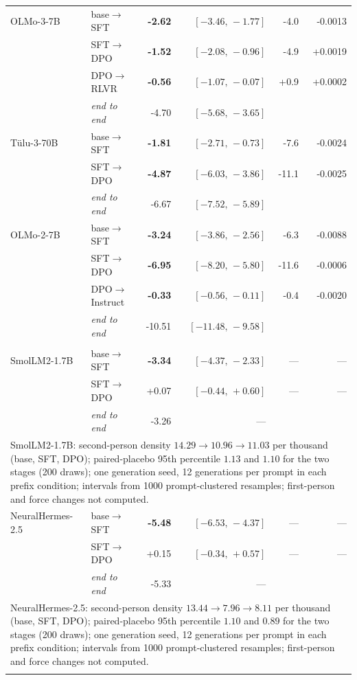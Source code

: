 \begin{table}[tb]
\begin{tabular}{llrrrr}
\addlinespace
OLMo-3-7B    & base$\rightarrow$SFT & \textbf{-2.62} & $[-3.46,\,-1.77]$ & -4.0 & -0.0013 \\
             & SFT$\rightarrow$DPO & \textbf{-1.52} & $[-2.08,\,-0.96]$ & -4.9 & +0.0019 \\
             & DPO$\rightarrow$RLVR & \textbf{-0.56} & $[-1.07,\,-0.07]$ & +0.9 & +0.0002 \\
 & \emph{end to end} & -4.70 & $[-5.68,\,-3.65]$ & & \\
\addlinespace
Tülu-3-70B   & base$\rightarrow$SFT & \textbf{-1.81} & $[-2.71,\,-0.73]$ & -7.6 & -0.0024 \\
             & SFT$\rightarrow$DPO & \textbf{-4.87} & $[-6.03,\,-3.86]$ & -11.1 & -0.0025 \\
 & \emph{end to end} & -6.67 & $[-7.52,\,-5.89]$ & & \\
\addlinespace
OLMo-2-7B    & base$\rightarrow$SFT & \textbf{-3.24} & $[-3.86,\,-2.56]$ & -6.3 & -0.0088 \\
             & SFT$\rightarrow$DPO & \textbf{-6.95} & $[-8.20,\,-5.80]$ & -11.6 & -0.0006 \\
             & DPO$\rightarrow$Instruct & \textbf{-0.33} & $[-0.56,\,-0.11]$ & -0.4 & -0.0020 \\
 & \emph{end to end} & -10.51 & $[-11.48,\,-9.58]$ & & \\
\addlinespace
\midrule
\multicolumn{6}{l}{\emph{Outside the AI2 and Zephyr pipelines (raw continuation)}}\\
SmolLM2-1.7B & base$\rightarrow$SFT & \textbf{-3.34} & $[-4.37,\,-2.33]$ & --- & --- \\
             & SFT$\rightarrow$DPO & +0.07 & $[-0.44,\,+0.60]$ & --- & --- \\
 & \emph{end to end} & -3.26 & --- & & \\
\multicolumn{6}{p{\linewidth}}{\footnotesize SmolLM2-1.7B: second-person density $14.29\rightarrow10.96\rightarrow11.03$ per thousand (base, SFT, DPO); paired-placebo 95th percentile $1.13$ and $1.10$ for the two stages (200 draws); one generation seed, 12 generations per prompt in each prefix condition; intervals from 1000 prompt-clustered resamples; first-person and force changes not computed.}\\
\addlinespace
NeuralHermes-2.5 & base$\rightarrow$SFT & \textbf{-5.48} & $[-6.53,\,-4.37]$ & --- & --- \\
             & SFT$\rightarrow$DPO & +0.15 & $[-0.34,\,+0.57]$ & --- & --- \\
 & \emph{end to end} & -5.33 & --- & & \\
\multicolumn{6}{p{\linewidth}}{\footnotesize NeuralHermes-2.5: second-person density $13.44\rightarrow7.96\rightarrow8.11$ per thousand (base, SFT, DPO); paired-placebo 95th percentile $1.10$ and $0.89$ for the two stages (200 draws); one generation seed, 12 generations per prompt in each prefix condition; intervals from 1000 prompt-clustered resamples; first-person and force changes not computed.}\\
\addlinespace
\bottomrule
\end{tabular}
\end{table}

